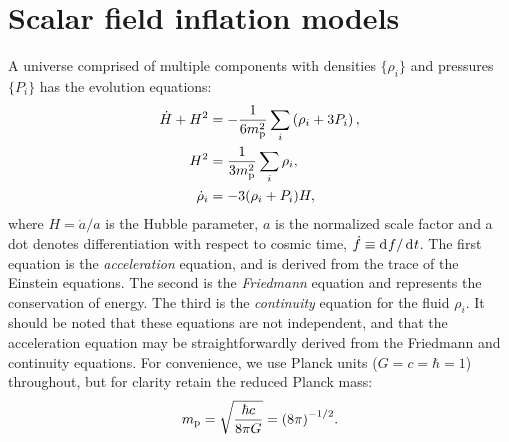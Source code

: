 \section{Scalar field inflation models}
\label{sec:Scalar_field_inflation_models}
%
A universe comprised of multiple components  with densities
\(\{\rho_i\}\) and pressures \(\{P_i\}\) has the evolution equations:
%
\begin{align}
  \dot{H}+H^2 &= 
  -\frac{1}{6m_{\mathrm{p}}^2}\sum\limits_i\left( \rho_i + 3P_i\right), 
  \label{eqn:Raychaudhuri_rho}
  \\
  H^2 &= 
  \frac{1}{3m_{\mathrm{p}}^2}\sum\limits_i \rho_i, 
  \\
  \dot{\rho}_i 
  &= -3(\rho_i + P_i)H,  
  \label{eqn:conservation}
\end{align}
%
where \(H=\dot{a}/a\) is the Hubble parameter, \(a\) is the normalized scale factor and a dot denotes differentiation with respect to cosmic time, \(\dot{f}\equiv \operatorname{d}^{}\!{f}/\operatorname{d}^{}\!{t}\). The first equation is the {\em acceleration\/} equation, and is derived from the trace of the Einstein equations. The second is the {\em Friedmann\/} equation and represents the conservation of energy. The third is the {\em continuity\/} equation for the fluid \(\rho_i\). It should be noted that these equations are not independent, and that the acceleration equation may be straightforwardly derived from the Friedmann and continuity equations.  For convenience, we use Planck units (\(G=c=\hbar=1\)) throughout, but for clarity retain the reduced Planck mass: 
%
\[m_{\mathrm{p}} = \sqrt{\frac{\hbar c}{8\pi G}} = {(8\pi)}^{-1/2}.\]  
%


